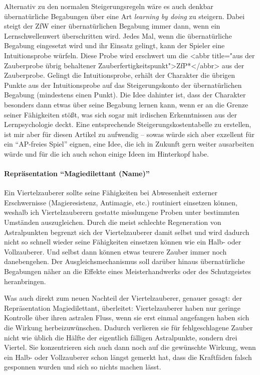 Alternativ zu den normalen Steigerungsregeln wäre es auch denkbar übernatürliche Begabungen über eine Art \textit{learning by doing} zu steigern. Dabei steigt der ZfW einer übernatürlichen Begabung immer dann, wenn ein Lernschwellenwert überschritten wird. Jedes Mal, wenn die übernatürliche Begabung eingesetzt wird und ihr Einsatz gelingt, kann der Spieler eine Intuitionsprobe würfeln. Diese Probe wird erschwert um die <abbr title="aus der Zauberprobe übrig behaltener Zauberfertigkeitspunkt">ZfP*</abbr> aus der Zauberprobe. Gelingt die Intuitionsprobe, erhält der Charakter die übrigen Punkte aus der Intuitionsprobe auf das Steigerungskonto der übernatürlichen Begabung (mindestens einen Punkt). Die Idee dahinter ist, dass der Charakter besonders dann etwas über seine Begabung lernen kann, wenn er an die Grenze seiner Fähigkeiten stößt, was sich sogar mit irdischen Erkenntnissen aus der Lernpsychologie deckt. Eine entsprechende Steigerungskostentabelle zu erstellen, ist mir aber für diesen Artikel zu aufwendig -- sowas würde sich aber exzellent für ein \enquote{AP-freies Spiel} eignen, eine Idee, die ich in Zukunft gern weiter ausarbeiten würde und für die ich auch schon einige Ideen im Hinterkopf habe.

\paragraph{Repräsentation \enquote{Magiedilettant (Name)}}
Ein Viertelzauberer sollte seine Fähigkeiten bei Abwesenheit externer Erschwernisse (Magieresistenz, Antimagie, etc.) routiniert einsetzen können, weshalb ich Viertelzauberern gestatte misslungene Proben unter bestimmten Umständen auszugleichen. Durch die meist schlechte Regeneration von Astralpunkten begrenzt sich der Viertelzauberer damit selbst und wird dadurch nicht so schnell wieder seine Fähigkeiten einsetzen können wie ein Halb- oder Vollzauberer. Und selbst dann können etwas teurere Zauber immer noch danebengehen. Der Ausgleichsmechanismus soll darüber hinaus übernatürliche Begabungen näher an die Effekte eines Meisterhandwerks oder des Schutzgeistes heranbringen.

Was auch direkt zum neuen Nachteil der Viertelzauberer, genauer gesagt: der Repräsentation Magiedilettant, überleitet: Viertelzauberer haben nur geringe Kontrolle über ihren astralen Fluss, wenn sie erst einmal angefangen haben sich die Wirkung herbeizuwünschen. Dadurch verlieren sie für fehlgeschlagene Zauber nicht wie üblich die Hälfte der eigentlich fälligen Astralpunkte, sondern drei Viertel. Sie konzentrieren sich auch dann noch auf die gewünschte Wirkung, wenn ein Halb- oder Vollzauberer schon längst gemerkt hat, dass die Kraftfäden falsch gesponnen wurden und sich so nichts machen lässt.


